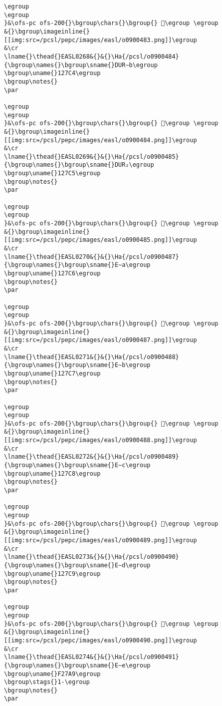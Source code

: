 \begin{verbatim}
\egroup
\egroup
}&\ofs-pc ofs-200{}\bgroup\chars{}\bgroup{} 𒟃\egroup \egroup
&{}\bgroup\imageinline{}[[img:src=/pcsl/pepc/images/easl/o0900483.png]]\egroup
&\cr
\lname{}\thead{}EASL0268&{}&{}\Ha{/pcsl/o0900484}{\bgroup\names{}\bgroup\sname{}DUR∼b\egroup
\bgroup\uname{}127C4\egroup
\bgroup\notes{}
\par 

\egroup
\egroup
}&\ofs-pc ofs-200{}\bgroup\chars{}\bgroup{} 𒟄\egroup \egroup
&{}\bgroup\imageinline{}[[img:src=/pcsl/pepc/images/easl/o0900484.png]]\egroup
&\cr
\lname{}\thead{}EASL0269&{}&{}\Ha{/pcsl/o0900485}{\bgroup\names{}\bgroup\sname{}DUR₂\egroup
\bgroup\uname{}127C5\egroup
\bgroup\notes{}
\par 

\egroup
\egroup
}&\ofs-pc ofs-200{}\bgroup\chars{}\bgroup{} 𒟅\egroup \egroup
&{}\bgroup\imageinline{}[[img:src=/pcsl/pepc/images/easl/o0900485.png]]\egroup
&\cr
\lname{}\thead{}EASL0270&{}&{}\Ha{/pcsl/o0900487}{\bgroup\names{}\bgroup\sname{}E∼a\egroup
\bgroup\uname{}127C6\egroup
\bgroup\notes{}
\par 

\egroup
\egroup
}&\ofs-pc ofs-200{}\bgroup\chars{}\bgroup{} 𒟆\egroup \egroup
&{}\bgroup\imageinline{}[[img:src=/pcsl/pepc/images/easl/o0900487.png]]\egroup
&\cr
\lname{}\thead{}EASL0271&{}&{}\Ha{/pcsl/o0900488}{\bgroup\names{}\bgroup\sname{}E∼b\egroup
\bgroup\uname{}127C7\egroup
\bgroup\notes{}
\par 

\egroup
\egroup
}&\ofs-pc ofs-200{}\bgroup\chars{}\bgroup{} 𒟇\egroup \egroup
&{}\bgroup\imageinline{}[[img:src=/pcsl/pepc/images/easl/o0900488.png]]\egroup
&\cr
\lname{}\thead{}EASL0272&{}&{}\Ha{/pcsl/o0900489}{\bgroup\names{}\bgroup\sname{}E∼c\egroup
\bgroup\uname{}127C8\egroup
\bgroup\notes{}
\par 

\egroup
\egroup
}&\ofs-pc ofs-200{}\bgroup\chars{}\bgroup{} 𒟈\egroup \egroup
&{}\bgroup\imageinline{}[[img:src=/pcsl/pepc/images/easl/o0900489.png]]\egroup
&\cr
\lname{}\thead{}EASL0273&{}&{}\Ha{/pcsl/o0900490}{\bgroup\names{}\bgroup\sname{}E∼d\egroup
\bgroup\uname{}127C9\egroup
\bgroup\notes{}
\par 

\egroup
\egroup
}&\ofs-pc ofs-200{}\bgroup\chars{}\bgroup{} 𒟉\egroup \egroup
&{}\bgroup\imageinline{}[[img:src=/pcsl/pepc/images/easl/o0900490.png]]\egroup
&\cr
\lname{}\thead{}EASL0274&{}&{}\Ha{/pcsl/o0900491}{\bgroup\names{}\bgroup\sname{}E∼e\egroup
\bgroup\uname{}F27A9\egroup
\bgroup\stags{}1-\egroup
\bgroup\notes{}
\par 


\end{verbatim}
